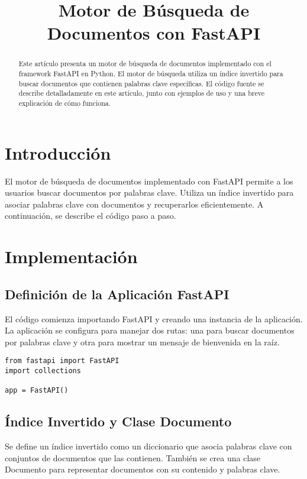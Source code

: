 \documentclass[journal]{IEEEtran}
\begin{document}
\title{Motor de Búsqueda de Documentos con FastAPI}

\author{
}

\maketitle

\begin{abstract}
Este artículo presenta un motor de búsqueda de documentos implementado con el framework FastAPI en Python. El motor de búsqueda utiliza un índice invertido para buscar documentos que contienen palabras clave específicas. El código fuente se describe detalladamente en este artículo, junto con ejemplos de uso y una breve explicación de cómo funciona.
\end{abstract}

\section{Introducción}
El motor de búsqueda de documentos implementado con FastAPI permite a los usuarios buscar documentos por palabras clave. Utiliza un índice invertido para asociar palabras clave con documentos y recuperarlos eficientemente. A continuación, se describe el código paso a paso.

\section{Implementación}

\subsection{Definición de la Aplicación FastAPI}
El código comienza importando FastAPI y creando una instancia de la aplicación. La aplicación se configura para manejar dos rutas: una para buscar documentos por palabras clave y otra para mostrar un mensaje de bienvenida en la raíz.

\begin{lstlisting}[style=custompython]
from fastapi import FastAPI
import collections

app = FastAPI()
\end{lstlisting}

\subsection{Índice Invertido y Clase Documento}
Se define un índice invertido como un diccionario que asocia palabras clave con conjuntos de documentos que las contienen. También se crea una clase Documento para representar documentos con su contenido y palabras clave.
\end{document}
